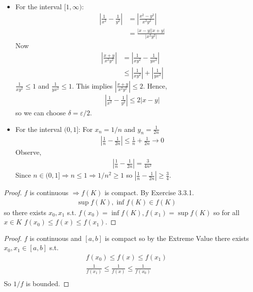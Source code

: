 \begin{itemize}
    \item For the interval $[1, \infty)$:
    \begin{align*}
        |\frac{1}{x^2} - \frac{1}{y^2}| &= |\frac{x^2-y^2}{x^2y^2}| \\
                                        &= \frac{|x-y||x+y|}{|x^2y^2|}
    \end{align*}
    Now
    \begin{align*}
        |\frac{x+y}{x^2y^2}| &= |\frac{1}{xy^2} - \frac{1}{yx^2}| \\
        &\leq |\frac{1}{xy^2}| + |\frac{1}{yx^2}|
    \end{align*}
    $\frac{1}{xy^2} \leq 1$ and $\frac{1}{yx^2} \leq 1$. This implies 
    $|\frac{x+y}{x^2y^2}| \leq 2$.
    Hence,
    \begin{align*}
        |\frac{1}{x^2} - \frac{1}{y^2}| \leq 2|x-y|
    \end{align*}
    so we can choose $\delta = \varepsilon/2$.

    \item For the interval $(0, 1]$:
    For $x_n=1/n$ and $y_n=\frac{1}{2n}$
    \begin{align*}
        |\frac{1}{n}-\frac{1}{2n}| \leq \frac{1}{n} + \frac{1}{2n} \rightarrow 0
    \end{align*}
    Observe,
    \begin{align*}
        |\frac{1}{n}-\frac{1}{2n}| = \frac{3}{4n^2}
    \end{align*}
    Since $n\in (0,1] \Rightarrow n\leq 1 \Rightarrow 1/n^2\geq 1$
    so $|\frac{1}{n}-\frac{1}{2n}| \geq \frac{3}{4}$.
\end{itemize}


\begin{proof}
    $f$ is continuous $\Rightarrow f(K)$ is compact. 
    By Exercise 3.3.1. 
    \begin{align*}
        \sup f(K), \inf f(K) \in f(K)
    \end{align*}
    so there exists $x_0, x_1$ s.t. $f(x_0) = \inf f(K), f(x_1) = \sup f(K)$
    so for all $x\in K$ $f(x_0) \leq f(x) \leq f(x_1)$.
\end{proof}

\begin{proof}
    $f$ is continuous and $[a,b]$ is compact so by the Extreme Value 
    \Thm there exists $x_0,x_1\in [a,b]$ s.t. 
    \begin{gather*}
        f(x_0)\leq f(x)\leq f(x_1) \\
        \frac{1}{f(x_1)}\leq \frac{1}{f(x)} \leq \frac{1}{f(x_0)} \\
    \end{gather*}
    So $1/f$ is bounded.
\end{proof}

